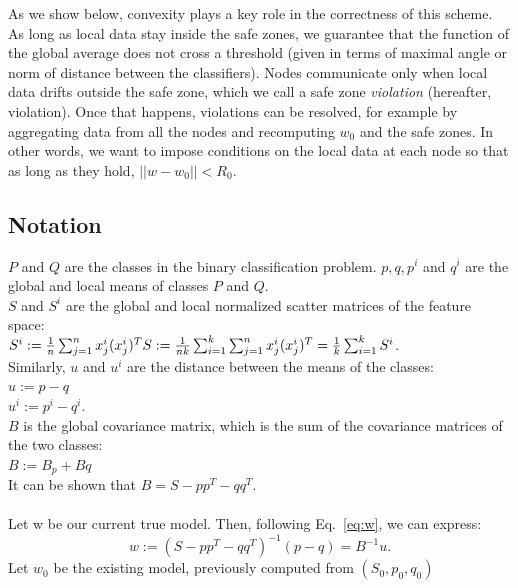 \documentclass{sig-alternate-05-2015}
\begin{document}
\par As we show below, convexity
plays a key role in the correctness of this scheme. As long
as local data stay inside the safe zones, we guarantee that
the function of the global average does not cross a threshold (given
in terms of maximal angle or norm of distance between the classifiers).
Nodes communicate only when local data drifts outside the
safe zone, which we call a safe zone \textit{violation} (hereafter,
violation). Once that happens, violations can be resolved,
for example by aggregating data from all the nodes and recomputing $w_0$
and the safe zones.
In other words, we want to impose conditions on the local
data at each node so that as long as they hold, $||w-w_0||<R_0$.

\subsection{Notation}
\noindent
$P$ and $Q$ are the classes in the binary classification problem.
 $p,q,p^i$ and $q^i$  are the global and local means of classes $P$ and $Q$.
\\$S$ and $S^i$  are the global and local normalized scatter matrices of the feature space:
\\$S^i := \frac{1}{n}\sum_{j=1}^{n}x^i_j(x^i_j)^T
\\S := \frac{1}{nk}
\sum_{i=1}^k\sum_{j=1}^nx^i_j(x^i_j)^T=\frac{1}{k}\sum_{i=1}^kS^i$.
\\Similarly, $u$ and $u^i$ are the distance between the means of the classes:
\\$u:=p - q$
\\$u^i:=p^i - q^i$.
\\ $B$ is the global covariance matrix, which is the sum of the covariance
matrices of the two classes:
\\$B:=B_p+Bq$
\\It can be shown that
$B=S - pp^T - qq^T$.
\\\\Let w be our current true model. Then, following Eq.~\ref{eq:w}, we can
express:
\begin{equation*}
w:=(S - pp^T - qq^T)^{-1}(p-q)=B^{-1}u.
\end{equation*}
Let $w_0$ be the existing model, previously computed from $(S_0, p_0, q_0)$
\end{document}
